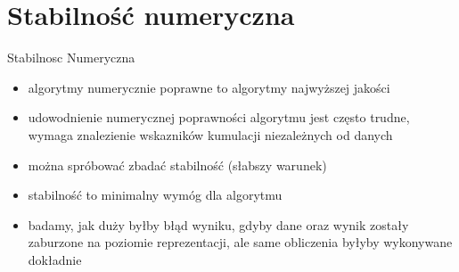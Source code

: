 \section{Stabilność numeryczna}
\begin{frame}{Stabilnosc Numeryczna}
    \begin{itemize}
        \item algorytmy numerycznie poprawne to algorytmy najwyższej jakości
        \item udowodnienie numerycznej poprawności algorytmu jest często trudne, wymaga znalezienie wskazników kumulacji niezależnych od danych
        \item można spróbować zbadać stabilność (słabszy warunek)
         \item  stabilność to  minimalny wymóg dla algorytmu
        \item badamy, jak duży byłby błąd wyniku, gdyby dane oraz wynik zostały zaburzone na poziomie reprezentacji, ale same   obliczenia byłyby wykonywane dokładnie
    \end{itemize}
\end{frame}
